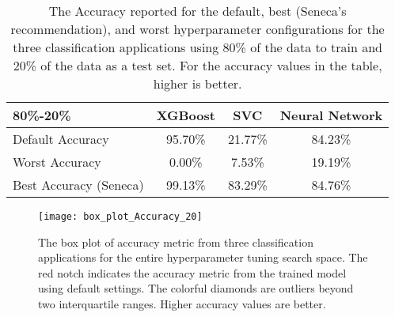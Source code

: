 \begin{table}
\centering
\begin{tabular}{|l|c|c|c|}
\hline
\textbf{80\%-20\%} & XGBoost & SVC & Neural Network\\
\hline
\hline
Default Accuracy & 95.70\% & 21.77\% & 84.23\%\\
\hline
Worst Accuracy&0.00\%&7.53\% & 19.19\%\\
\hline
Best Accuracy (Seneca) &99.13\% & 83.29\% & 84.76\%\\
\hline

\end{tabular}
\caption{The Accuracy reported for the 
default, best (Seneca's recommendation), and worst hyperparameter configurations for 
the three classification applications using 80\% of the data to train and 20\%
of the data as a test set. 
For the accuracy values in the table, higher is better.
\label{tab:accuracy}}
\end{table}

\begin{figure}[t] \centering 
\vspace{-0.2in}
\texttt{[image: box\_plot\_Accuracy\_20]}
\caption{The box plot of accuracy metric from three classification applications for the entire hyperparameter tuning search space. The red notch indicates the accuracy metric from the trained model using default settings. The colorful diamonds are outliers beyond two interquartile ranges. Higher accuracy values are better.
\label{fig:box_plot_accuracy}}
\vspace{-0.1in}
\end{figure}

